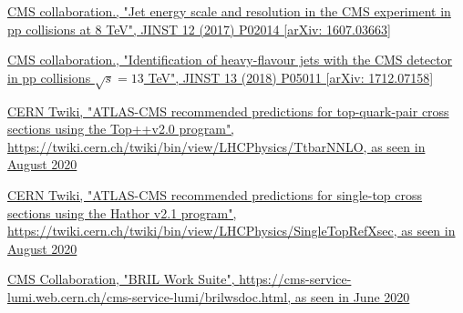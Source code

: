 \documentclass[a4paper, 10pt, openright]{report}
\begin{document}
\begin{thebibliography}{1}
\href{https://arxiv.org/abs/1607.03663}{CMS collaboration.,
"Jet energy scale and resolution in the CMS experiment in pp collisions at 8 TeV", 		JINST 12 (2017) P02014 [arXiv: 1607.03663]}

\href{https://arxiv.org/abs/1712.07158}{CMS collaboration.,
"Identification of heavy-flavour jets with the CMS detector in pp collisions $\sqrt{s} = 13$ TeV", 		JINST 13 (2018) P05011 [arXiv: 1712.07158]}

\href{https://twiki.cern.ch/twiki/bin/view/LHCPhysics/TtbarNNLO}{CERN Twiki,
"ATLAS-CMS recommended predictions for top-quark-pair cross sections using the Top++v2.0 program", \url{https://twiki.cern.ch/twiki/bin/view/LHCPhysics/TtbarNNLO}, as seen in August 2020}

\href{https://twiki.cern.ch/twiki/bin/view/LHCPhysics/SingleTopRefXsec}{CERN Twiki, 
"ATLAS-CMS recommended predictions for single-top cross sections using the Hathor v2.1 program",
\url{https://twiki.cern.ch/twiki/bin/view/LHCPhysics/SingleTopRefXsec}, as seen in August 2020}


\href{https://cms-service-lumi.web.cern.ch/cms-service-lumi/brilwsdoc.html}{CMS Collaboration,
"BRIL Work Suite", \url{https://cms-service-lumi.web.cern.ch/cms-service-lumi/brilwsdoc.html}, as seen in June 2020}

\end{thebibliography}
\end{document}
